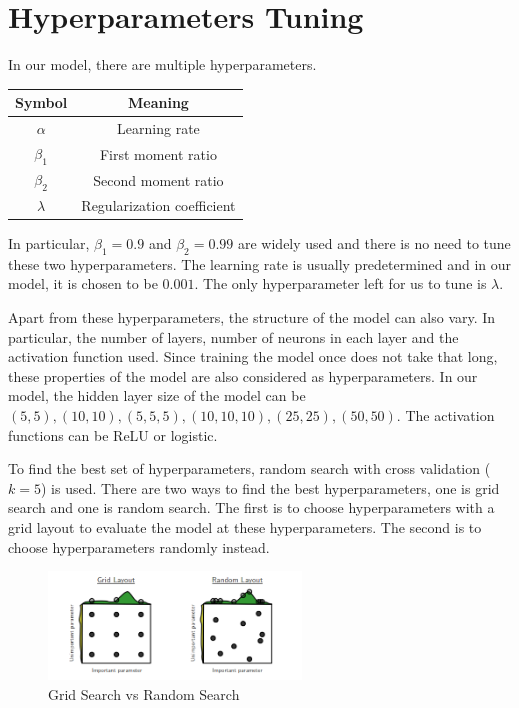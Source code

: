 \documentclass[12pt]{article}
\theoremstyle{remark}
\begin{document}
\section{Hyperparameters Tuning}
In our model, there are multiple hyperparameters.
\begin{center}
	\begin{tabular}{cc}
		\toprule
		Symbol      & Meaning                    \\\midrule
		\(\alpha \) & Learning rate              \\\midrule
		\(\beta_1\) & First moment ratio         \\\midrule
		\(\beta_2\) & Second moment ratio        \\\midrule
		\(\lambda\) & Regularization coefficient \\\bottomrule
	\end{tabular}
\end{center}
In particular, \(\beta_1 = 0.9\) and \(\beta_2 = 0.99\) are widely used and there is no need to tune these two hyperparameters. The learning rate is usually predetermined and in our model, it is chosen to be \(0.001\). The only hyperparameter left for us to tune is \(\lambda\).

Apart from these hyperparameters, the structure of the model can also vary. In particular, the number of layers, number of neurons in each layer and the activation function used. Since training the model once does not take that long, these properties of the model are also considered as hyperparameters. In our model, the hidden layer size of the model can be \((5,5), (10,10), (5,5,5), (10,10,10), (25, 25), (50, 50)\). The activation functions can be ReLU or logistic.

To find the best set of hyperparameters, random search with cross validation (\(k = 5\)) is used. There are two ways to find the best hyperparameters, one is grid search and one is random search. The first is to choose hyperparameters with a grid layout to evaluate the model at these hyperparameters. The second is to choose hyperparameters randomly instead.
\begin{figure}[!h]
	\centering
	\includegraphics[width=0.6\textwidth]{search.png}
	\caption{Grid Search vs Random Search}
	\label{fig:search}
\end{figure}
\end{document}
